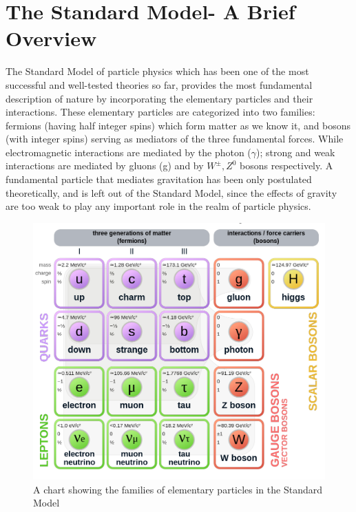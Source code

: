 \section{The Standard Model- A Brief Overview}
The Standard Model of particle physics which has been one of the most successful and well-tested theories so far, provides the most fundamental description of nature by incorporating the elementary particles and their interactions. These elementary particles are categorized into two families: fermions (having half integer spins) which form matter as we know it, and bosons (with integer spins) serving as mediators of the three fundamental forces. While electromagnetic interactions are mediated by the photon ($\gamma$); strong and weak interactions are mediated by gluons (g) and by $W^{\pm}, Z^{0}$ bosons respectively. A fundamental particle that mediates gravitation has been only postulated theoretically, and is left out of the Standard Model, since the effects of gravity are too weak to play any important role in the realm of particle physics. 

\begin{figure}[h!]
\centering
\includegraphics[scale=0.4]{./images/Standard_Model_of_Elementary_Particles.png}
\caption[The Standard Model of elementary particles]{A chart showing the families of elementary particles in the Standard Model \cite{stdmodel}}
\label{fig:StdModel}
\end{figure}

